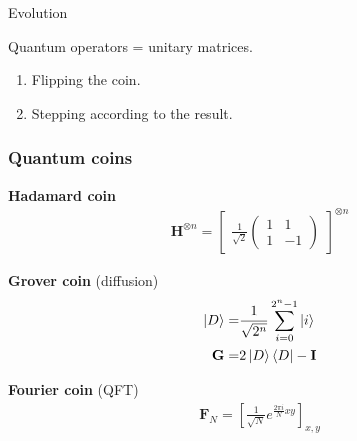 \documentclass[aspectratio=169]{beamer}
\begin{document}
\begin{frame}{Evolution}

Quantum operators = unitary matrices.

\begin{enumerate}
    \item Flipping the coin.
    \item Stepping according to the result.
\end{enumerate}

  \begin{center}
  \end{center}

\end{frame}

\begin{frame}
\frametitle{Quantum coins}

\pause

\textbf{Hadamard coin}
\vspace{-0.5cm}
\begin{align*}
  \mathbf{H}^{\otimes n} = \begin{bmatrix}\frac{1}{\sqrt{2}}\begin{pmatrix}
      1 & 1  \\
      1 & -1
  \end{pmatrix}
  \end{bmatrix}^{\otimes n}
\end{align*}

\pause
 
\textbf{Grover coin} (diffusion)
\vspace{-0.5cm}
\begin{align*}
\ket{D} =& \frac{1}{\sqrt{2^n}} \sum\limits_{i=0}^{2^n-1} \ket{i}\\
\mathbf{G} =& 2\ket{D}\bra{D} - \mathbf{I}
\end{align*}

\pause

\textbf{Fourier coin} (QFT)
\vspace{-0.5cm}
\begin{align*}
\mathbf{F}_N = \left[\frac{1}{\sqrt{N}} e^{\frac{2\pi{}i}{N}xy}\right]_{x,y}
\end{align*}
\end{frame}
\end{document}
